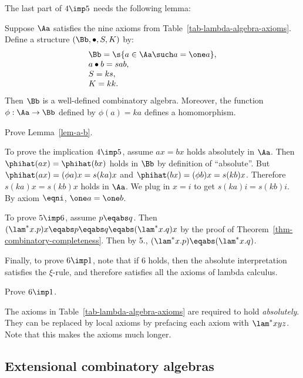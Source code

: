 \documentclass[12pt]{article}
\begin{document}
The last part of $4\imp 5$ needs the following lemma:

\begin{lemma}\label{lem-a-b}
  Suppose $\Aa$ satisfies the nine axioms from
  Table~\ref{tab-lambda-algebra-axioms}. Define a structure
  $(\Bb,\bullet,S,K)$ by:
  \[ \begin{array}{lll}
    \Bb = \s{a\in\Aa\such a=\one a},\\
    a\bullet b = sab,\\
    S=ks,\\
    K=kk.
  \end{array}
  \]
  Then $\Bb$ is a well-defined combinatory algebra. Moreover, the
  function $\phi:\Aa\to\Bb$ defined by $\phi(a)=ka$ defines a
  homomorphism.
\end{lemma}

\begin{exercise}
  Prove Lemma~\ref{lem-a-b}.
\end{exercise}

To prove the implication $4\imp 5$, assume $ax=bx$ holds absolutely in
$\Aa$. Then $\phihat(ax)=\phihat(bx)$ holds in $\Bb$ by definition of
``absolute''. But $\phihat(ax) = (\phi a)x = s(ka)x$ and $\phihat(bx)
= (\phi b)x = s(kb)x$. Therefore $s(ka)x=s(kb)x$ holds in $\Aa$. We
plug in $x=i$ to get $s(ka)i=s(kb)i$. By axiom $\eqni$, $\one a=\one b$.

To prove $5\imp 6$, assume $p\eqabs q$. Then $(\lam^*x.p)x \eqabs
p\eqabs q \eqabs (\lam^*x.q)x$ by the proof of
Theorem~\ref{thm-combinatory-completeness}. Then by 5.,
$(\lam^*x.p)\eqabs (\lam^*x.q)$.

Finally, to prove $6\imp 1$, note that if $6$ holds, then the absolute
interpretation satisfies the $\xi$-rule, and therefore satisfies all
the axioms of lambda calculus.

\begin{exercise}
  Prove $6\imp 1$.
\end{exercise}

\begin{remark}
  The axioms in Table~\ref{tab-lambda-algebra-axioms} are required to
  hold {\em absolutely}. They can be replaced by local axioms by
  prefacing each axiom with $\lam^*xyz$. Note that this makes the
  axioms much longer.
\end{remark}

\subsection{Extensional combinatory algebras}
\label{subsec-extensional-combinatory}
\end{document}
